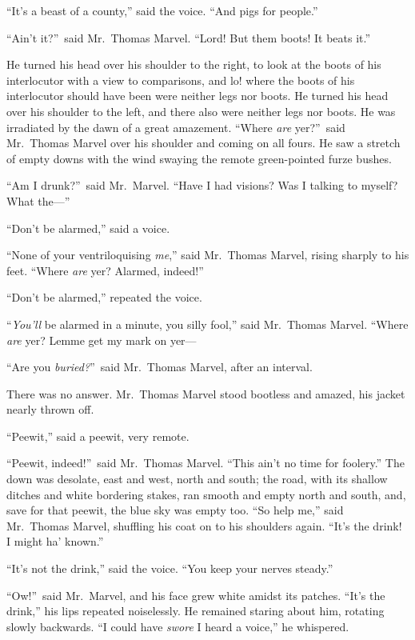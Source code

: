 “It’s a beast of a county,” said the voice. “And pigs for people.”

“Ain’t it?”\ said Mr.\ Thomas Marvel. “Lord! But them boots! It beats it.”

He turned his head over his shoulder to the right, to look at the boots of his interlocutor with a view to comparisons, and lo! where the boots of his interlocutor should have been were neither legs nor boots. He turned his head over his shoulder to the left, and there also were neither legs nor boots. He was irradiated by the dawn of a great amazement. “Where \emph{are} yer?”\ said Mr.\ Thomas Marvel over his shoulder and coming on all fours. He saw a stretch of empty downs with the wind swaying the remote green-pointed furze bushes.

“Am I drunk?”\ said Mr.\ Marvel. “Have I had visions? Was I talking to myself? What the—”

“Don’t be alarmed,” said a voice.

“None of your ventriloquising \emph{me},” said Mr.\ Thomas Marvel, rising sharply to his feet. “Where \emph{are} yer? Alarmed, indeed!”

“Don’t be alarmed,” repeated the voice.

“\emph{You’ll} be alarmed in a minute, you silly fool,” said Mr.\ Thomas Marvel. “Where \emph{are} yer? Lemme get my mark on yer—

“Are you \emph{buried?}”\ said Mr.\ Thomas Marvel, after an interval.

There was no answer. Mr.\ Thomas Marvel stood bootless and amazed, his jacket nearly thrown off.

“Peewit,” said a peewit, very remote.

“Peewit, indeed!”\ said Mr.\ Thomas Marvel. “This ain’t no time for foolery.” The down was desolate, east and west, north and south; the road, with its shallow ditches and white bordering stakes, ran smooth and empty north and south, and, save for that peewit, the blue sky was empty too. “So help me,” said Mr.\ Thomas Marvel, shuffling his coat on to his shoulders again. “It’s the drink! I might ha’ known.”

“It’s not the drink,” said the voice. “You keep your nerves steady.”

“Ow!”\ said Mr.\ Marvel, and his face grew white amidst its patches. “It’s the drink,” his lips repeated noiselessly. He remained staring about him, rotating slowly backwards. “I could have \emph{swore} I heard a voice,” he whispered.

